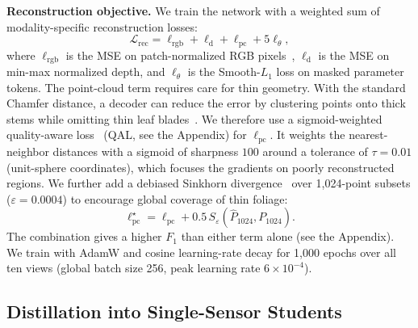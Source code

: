 \documentclass[10pt,twocolumn,letterpaper]{article}
\newcommand{\appendixref}[1]{\hyperref[#1]{Appendix~\ref*{#1}}}
\begin{document}
\noindent\textbf{Reconstruction objective.}
We train the network with a weighted sum of modality-specific reconstruction losses:
\begin{equation}
  \mathcal{L}_{\mathrm{rec}} = \ell_{\mathrm{rgb}} + \ell_{\mathrm{d}} + \ell_{\mathrm{pc}} + 5\ell_\theta,
  \label{eq:reconstruction-loss}
\end{equation}
where $\ell_{\mathrm{rgb}}$ is the MSE on patch-normalized RGB pixels~\citep{he2022mae}, $\ell_{\mathrm{d}}$ is the MSE on min-max normalized depth, and $\ell_\theta$ is the Smooth-$L_1$ loss on masked parameter tokens. The point-cloud term requires care for thin geometry. With the standard Chamfer distance, a decoder can reduce the error by clustering points onto thick stems while omitting thin leaf blades~\citep{wu2021dcd,song2026structural}. We therefore use a sigmoid-weighted quality-aware loss~\citep{meshram2026qal} (QAL, see the Appendix) for $\ell_{\mathrm{pc}}$. It weights the nearest-neighbor distances with a sigmoid of sharpness $100$ around a tolerance of $\tau = 0.01$ (unit-sphere coordinates), which focuses the gradients on poorly reconstructed regions. We further add a debiased Sinkhorn divergence~\citep{feydy2019sinkhorn} over 1{,}024-point subsets ($\varepsilon = 0.0004$) to encourage global coverage of thin foliage:
\begin{equation}
  \ell_{\mathrm{pc}}^{\star} = \ell_{\mathrm{pc}} + 0.5\,S_{\varepsilon}\!\left(\hat P_{1024}, P_{1024}\right).
  \label{eq:point-loss-sinkhorn}
\end{equation}
The combination gives a higher $F_1$ than either term alone (see the Appendix). We train with AdamW and cosine learning-rate decay for 1{,}000 epochs over all ten views (global batch size 256, peak learning rate $6 \times 10^{-4}$).

\subsection{Distillation into Single-Sensor Students}
\label{sec:distill}\label{sec:method-distill}
\end{document}
